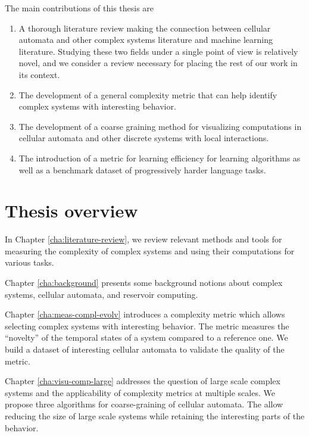 The main contributions of this thesis are
\begin{enumerate}
  \item A thorough literature review making the connection between cellular
        automata and other complex systems literature and machine learning
        literature. Studying these two fields under a single point of view is
        relatively novel, and we consider a review necessary for placing the
        rest of our work in its context.

  \item The development of a general complexity metric that can help identify
        complex systems with interesting behavior.

  \item The development of a coarse graining method for visualizing computations
        in cellular automata and other discrete systems with local interactions.

  \item The introduction of a metric for learning efficiency for learning
        algorithms as well as a benchmark dataset of progressively harder
        language tasks.
\end{enumerate}

\section{Thesis overview}

In Chapter \ref{cha:literature-review}, we review relevant methods and tools for
measuring the complexity of complex systems and using their computations for
various tasks.

Chapter \ref{cha:background} presents some background notions about complex
systems, cellular automata, and reservoir computing.

Chapter \ref{cha:meas-compl-evolv} introduces a complexity metric which allows
selecting complex systems with interesting behavior. The metric measures the
``novelty'' of the temporal states of a system compared to a reference one. We
build a dataset of interesting cellular automata to validate the quality of the
metric.

Chapter \ref{cha:visu-comp-large} addresses the question of large scale complex
systems and the applicability of complexity metrics at multiple scales. We
propose three algorithms for coarse-graining of cellular automata. The allow
reducing the size of large scale systems while retaining the interesting parts
of the behavior.

